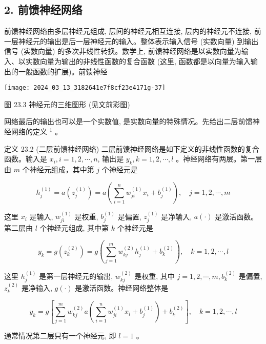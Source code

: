 \documentclass[10pt]{article}
\begin{document}
\begin{CJK*}{UTF8}{bsmi}
\section*{2. 前馈神经网络}
前馈神经网络由多层神经元组成, 层间的神经元相互连接, 层内的神经元不连接, 前一层神经元的输出是后一层神经元的输入。整体表示输入信号 (实数向量) 到输出信号 (实数向量) 的多次非线性转换。数学上, 前馈神经网络是以实数向量为输入、以实数向量为输出的非线性函数的复合函数 (这里, 函数都是以向量为输入输出的一般函数的扩展)。前馈神经

\begin{center}
\texttt{[image: 2024\_03\_13\_3182641e7f8cf23e4171g-37]}
\end{center}

图 23.3 神经元的三维图形 (见文前彩图)

网络最后的输出也可以是一个实数值, 是实数向量的特殊情况。先给出二层前馈神经网络的定义 ${ }^{1}$ 。

定义 23.2 (二层前馈神经网络) 二层前馈神经网络是如下定义的非线性函数的复合函数。输入是 $x_{i}, i=1,2, \cdots, n$, 输出是 $y_{k}, k=1,2, \cdots, l$ 。神经网络有两层。第一层由 $m$ 个神经元组成，其中第 $j$ 个神经元是


\begin{equation*}
h_{j}^{(1)}=a\left(z_{j}^{(1)}\right)=a\left(\sum_{i=1}^{n} w_{j i}^{(1)} x_{i}+b_{j}^{(1)}\right), \quad j=1,2, \cdots, m \tag{23.5}
\end{equation*}


这里 $x_{i}$ 是输入, $w_{j i}^{(1)}$ 是权重, $b_{j}^{(1)}$ 是偏置, $z_{j}^{(1)}$ 是净输入, $a(\cdot)$ 是激活函数。第二层由 $l$ 个神经元组成, 其中第 $k$ 个神经元是


\begin{equation*}
y_{k}=g\left(z_{k}^{(2)}\right)=g\left(\sum_{j=1}^{m} w_{k j}^{(2)} h_{j}^{(1)}+b_{k}^{(2)}\right), \quad k=1,2, \cdots, l \tag{23.6}
\end{equation*}


这里 $h_{j}^{(1)}$ 是第一层神经元的输出, $w_{k j}^{(2)}$ 是权重, 其中 $j=1,2, \cdots, m, b_{k}^{(2)}$ 是偏置, $z_{k}^{(2)}$ 是净输入, $g(\cdot)$ 是激活函数。神经网络整体是


\begin{equation*}
y_{k}=g\left[\sum_{j=1}^{m} w_{k j}^{(2)} a\left(\sum_{i=1}^{n} w_{j i}^{(1)} x_{i}+b_{j}^{(1)}\right)+b_{k}^{(2)}\right], \quad k=1,2, \cdots, l \tag{23.7}
\end{equation*}


通常情况第二层只有一个神经元, 即 $l=1$ 。


\end{CJK*}
\end{document}
